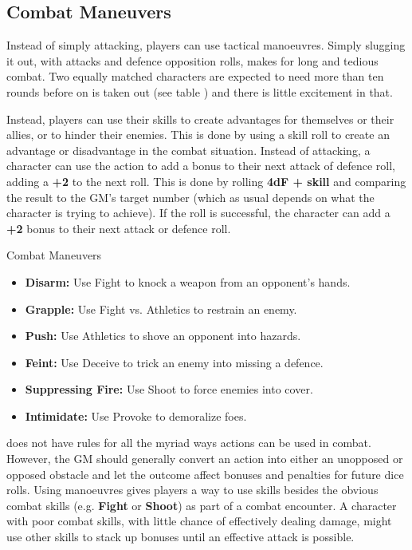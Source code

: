 \begin{multicols}{2}
\subsection{Combat Maneuvers}
Instead of simply attacking, players can use tactical manoeuvres. Simply slugging it out, with attacks and defence opposition rolls, makes for long and tedious combat. Two equally matched characters are expected to need more than ten rounds before on is taken out (see table ) and there is little excitement in that.

Instead, players can use their skills to create advantages for themselves or their allies, or to hinder their enemies. This is done by using a skill roll to create an advantage or disadvantage in the combat situation. Instead of attacking, a character can use the action to add a bonus to their next attack of defence roll, adding a \textbf{+2} to the next roll. This is done by rolling \textbf{4dF + skill} and comparing the result to the GM's target number (which as usual depends on what the character is trying to achieve). If the roll is successful, the character can add a \textbf{+2} bonus to their next attack or defence roll.

\begin{Example}{Combat Maneuvers}
	\begin{itemize}\raggedright
    	\item \textbf{Disarm:} Use Fight to knock a weapon from an opponent’s hands.
	    \item \textbf{Grapple:} Use Fight vs. Athletics to restrain an enemy.
    	\item \textbf{Push:} Use Athletics to shove an opponent into hazards.
	    \item \textbf{Feint:} Use Deceive to trick an enemy into missing a defence.
    	\item \textbf{Suppressing Fire:} Use Shoot to force enemies into cover.
	    \item \textbf{Intimidate:} Use Provoke to demoralize foes.
	\end{itemize}
\end{Example}

\wyrd does not have rules for all the myriad ways actions can be used in combat. However, the GM should generally convert an action into either an unopposed or opposed obstacle and let the outcome affect bonuses and penalties for future dice rolls. Using manoeuvres gives players a way to use skills besides the obvious combat skills (e.g. \textbf{Fight} or \textbf{Shoot}) as part of a combat encounter. A character with poor combat skills, with little chance of effectively dealing damage, might use other skills to stack up bonuses until an effective attack is possible.


\end{multicols}
